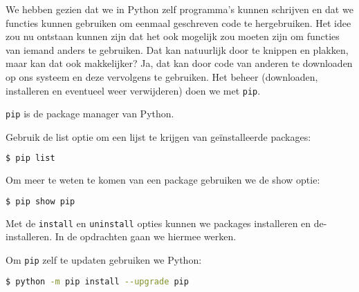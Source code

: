 We hebben gezien dat we in Python zelf programma's kunnen schrijven en dat we functies kunnen gebruiken om eenmaal geschreven code te hergebruiken. Het idee zou nu ontstaan kunnen zijn dat het ook mogelijk zou moeten zijn om functies van iemand anders te gebruiken. Dat kan natuurlijk door te knippen en plakken, maar kan dat ook makkelijker? Ja, dat kan door code van anderen te downloaden op ons systeem en deze vervolgens te gebruiken. Het beheer (downloaden, installeren en eventueel weer verwijderen) doen we met \texttt{pip}.

\texttt{pip} is de package manager van Python.

Gebruik de list optie om een lijst te krijgen van ge\"installeerde packages:
\begin{lstlisting}[language=bash]
$ pip list
\end{lstlisting}

Om meer te weten te komen van een package gebruiken we de show optie:
\begin{lstlisting}[language=bash]
$ pip show pip
\end{lstlisting}

Met de \texttt{install} en \texttt{uninstall} opties kunnen we packages installeren en de-installeren. In de opdrachten gaan we hiermee werken.

Om \texttt{pip} zelf te updaten gebruiken we Python:
\begin{lstlisting}[language=bash]
$ python -m pip install --upgrade pip
\end{lstlisting}

